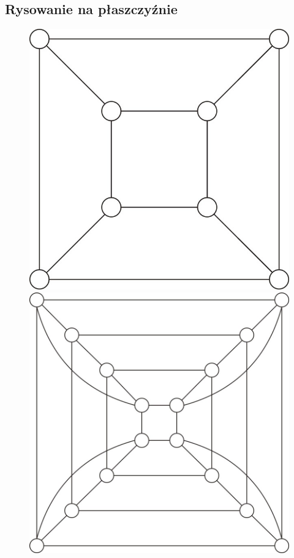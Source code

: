 \documentclass{pracamgr}
\begin{document}
   \subsection{Rysowanie na płaszczyźnie}
    \begin{figure}
     \includegraphics[scale=0.4]{img/Q3_planar.jpg}\includegraphics[scale=0.4]{img/Q4_not_planar.jpg}
    \end{figure}
\end{document}
